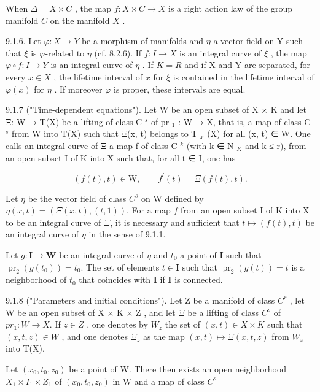 When \(\Delta = X \times C\) , the map \(f: X \times C \to X\) is a right action law of the group manifold \(C\) on the manifold \(X\) .

9.1.6. Let \(\varphi: X \to Y\) be a morphism of manifolds and \(\eta\) a vector field on Y such that \(\xi\) is \(\varphi\)-related to \(\eta\) (cf. 8.2.6). If \(f: I \to X\) is an integral curve of \(\xi\) , the map \(\varphi \circ f: I \to Y\) is an integral curve of \(\eta\) . If \(K = R\) and if X and Y are separated, for every \(x \in X\) , the lifetime interval of \(x\) for \(\xi\) is contained in the lifetime interval of \(\varphi(x)\) for \(\eta\) . If moreover \(\varphi\) is proper, these intervals are equal.

9.1.7 ("Time-dependent equations"). Let W be an open subset of X × K and let Ξ: W → T(X) be a lifting of class C \(^{s}\) of pr \(_{1}\) : W → X, that is, a map of class C \(^{s}\) from W into T(X) such that Ξ(x, t) belongs to T \(_{x}\) (X) for all (x, t) ∈ W. One calls an integral curve of Ξ a map f of class C \(^{k}\) (with k ∈ N \(_{K}\) and k ≤ r), from an open subset I of K into X such that, for all t ∈ I, one has

\[
(f (t), t) \in \mathrm{W},\qquad f ^ {\prime} (t) = \Xi (f (t), t).
\]

Let \(\eta\) be the vector field of class \(C^s\) on W defined by \(\eta(x, t) = (\Xi(x, t), (t, 1))\). For a map \(f\) from an open subset I of K into X to be an integral curve of \(\Xi\), it is necessary and sufficient that \(t \mapsto (f(t), t)\) be an integral curve of \(\eta\) in the sense of 9.1.1.

Let \(g: \mathbf{I} \to \mathbf{W}\) be an integral curve of \(\eta\) and \(t_0\) a point of \(\mathbf{I}\) such that \(\operatorname{pr}_2(g(t_0)) = t_0\). The set of elements \(t \in \mathbf{I}\) such that \(\operatorname{pr}_2(g(t)) = t\) is a neighborhood of \(t_0\) that coincides with \(\mathbf{I}\) if \(\mathbf{I}\) is connected.

9.1.8 ("Parameters and initial conditions"). Let Z be a manifold of class \(C^{r}\) , let W be an open subset of X × K × Z , and let \(\Xi\) be a lifting of class \(C^{s}\) of \(pr_{1}: W \to X\). If \(z \in Z\) , one denotes by \(W_{z}\) the set of \((x, t) \in X \times K\) such that \((x, t, z) \in W\) , and one denotes \(\Xi_{z}\) as the map \((x, t) \mapsto \Xi(x, t, z)\) from \(W_{z}\) into T(X).

Let \((x_0, t_0, z_0)\) be a point of W. There then exists an open neighborhood \(X_1 \times I_1 \times Z_1\) of \((x_0, t_0, z_0)\) in W and a map of class \(C^s\)

